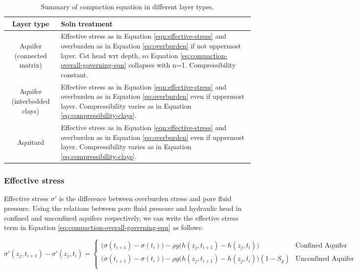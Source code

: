 \documentclass{article}
\begin{document}
\begin{table}[h]
\centering
\begin{tabular}{|c|p{9cm}|} 
\hline
\textbf{Layer type} & \textbf{Soln treatment} \\ 
\hline
Aquifer (connected matrix) & Effective stress as in Equation \ref{eqn:effective-stress} and overburden as in Equation \ref{eq:overburden} if not uppermost layer. Cst head wrt depth, so Equation \ref{eq:compaction-overall-governing-eqn} collapses with n=1. Compressibility constant.\\
\hline 
Aquifer (interbedded clays) & Effective stress as in Equation \ref{eqn:effective-stress} and overburden as in Equation \ref{eq:overburden} even if uppermost layer. Compressibility varies as in Equation \ref{eq:compressibility-clays}.\\
\hline 
Aquitard & Effective stress as in Equation \ref{eqn:effective-stress} and overburden as in Equation \ref{eq:overburden} even if uppermost layer. Compressibility varies as in Equation \ref{eq:compressibility-clays}.\\
\hline 
\end{tabular}
\caption{Summary of compaction equation in different layer types.}
\label{table:compaction-options}
\end{table}


\subsubsection{Effective stress}

Effective stress $\sigma'$ is the difference between overburden stress and pore fluid pressure. Using the relations between pore fluid pressure and hydraulic head in confined and unconfined aquifers respectively, we can write the effective stress term in Equation \ref{eq:compaction-overall-governing-eqn} as follows:

\begin{equation}
\label{eqn:effective-stress} 
\sigma'(z_j,t_{i+1}) - \sigma'(z_j,t_i) =
\begin{cases}
\bigg( \sigma (t_{i+1}) - \sigma(t_i) \bigg) - \rho g \big( h(z_j,t_{i+1}) - h(z_j,t_i) \big) & \text{Confined Aquifer} \\
\bigg( \sigma (t_{i+1}) - \sigma(t_i) \bigg) - \rho g \big( h(z_j,t_{i+1}) - h(z_j,t_i) \big)(1-S_y) & \text{Unconfined Aquifer} \\
\end{cases}
\end{equation}
\end{document}

